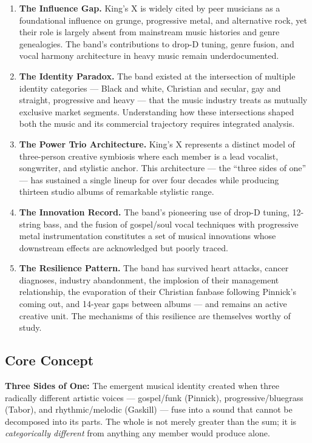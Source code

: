 \documentclass[11pt,letterpaper]{article}
\begin{document}
\begin{enumerate}[leftmargin=2em]
\item \textbf{The Influence Gap.} King's X is widely cited by peer musicians as a foundational influence on grunge, progressive metal, and alternative rock, yet their role is largely absent from mainstream music histories and genre genealogies. The band's contributions to drop-D tuning, genre fusion, and vocal harmony architecture in heavy music remain underdocumented.

\item \textbf{The Identity Paradox.} The band existed at the intersection of multiple identity categories --- Black and white, Christian and secular, gay and straight, progressive and heavy --- that the music industry treats as mutually exclusive market segments. Understanding how these intersections shaped both the music and its commercial trajectory requires integrated analysis.

\item \textbf{The Power Trio Architecture.} King's X represents a distinct model of three-person creative symbiosis where each member is a lead vocalist, songwriter, and stylistic anchor. This architecture --- the ``three sides of one'' --- has sustained a single lineup for over four decades while producing thirteen studio albums of remarkable stylistic range.

\item \textbf{The Innovation Record.} The band's pioneering use of drop-D tuning, 12-string bass, and the fusion of gospel/soul vocal techniques with progressive metal instrumentation constitutes a set of musical innovations whose downstream effects are acknowledged but poorly traced.

\item \textbf{The Resilience Pattern.} The band has survived heart attacks, cancer diagnoses, industry abandonment, the implosion of their management relationship, the evaporation of their Christian fanbase following Pinnick's coming out, and 14-year gaps between albums --- and remains an active creative unit. The mechanisms of this resilience are themselves worthy of study.
\end{enumerate}

\subsection{Core Concept}

\begin{quotebox}
\textbf{Three Sides of One:} The emergent musical identity created when three radically different artistic voices --- gospel/funk (Pinnick), progressive/bluegrass (Tabor), and rhythmic/melodic (Gaskill) --- fuse into a sound that cannot be decomposed into its parts. The whole is not merely greater than the sum; it is \textit{categorically different} from anything any member would produce alone.
\end{quotebox}
\end{document}
